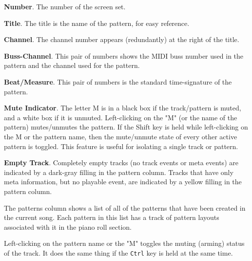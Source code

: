    \begin{enumber}
      \item \textbf{Number}.
         The number of the screen set.
      \item \textbf{Title}.
         The title is the name of the pattern, for easy reference.
      \item \textbf{Channel}.
         The channel number appears (redundantly)
         at the right of the title.
      \item \textbf{Buss-Channel}.
         This pair of numbers shows the MIDI buss number used in the pattern
         and the channel used for the pattern.
      \item \textbf{Beat/Measure}.
         This pair of numbers is the standard time-signature of the pattern.
      \item \textbf{Mute Indicator}.
         The letter M is in a black box if the track/pattern is muted, and a
         white box if it is unmuted.
         Left-clicking on the "M" (or the name of the pattern)
         mutes/unmutes the pattern.
         If the Shift key is held while left-clicking on the M or the pattern
         name, then
         the mute/unmute state of every other active pattern is toggled.
         This feature is useful for isolating a single track or pattern.
      \item \textbf{Empty Track}.
         Completely empty tracks (no track events or meta events)
         are indicated by a dark-gray filling in the pattern column.
         Tracks that have only meta information, but no playable event, are
         indicated by a yellow filling in the pattern column.
   \end{enumber}

   The patterns column shows a list of all of the patterns that have been
   created in the current song.  Each pattern in this list has a track of
   pattern layouts associated with it in the piano roll section.

   Left-clicking on the pattern name or the "M" toggles the muting
   (arming) status of the track.
   It does the same thing if the \texttt{Ctrl} key is held at the same time.

